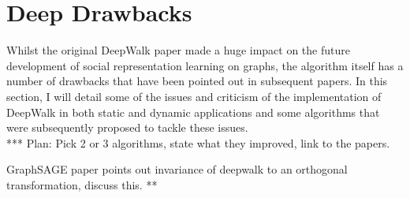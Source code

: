 \documentclass[a4paper]{article}
\begin{document}
\section{Deep Drawbacks}
Whilst the original DeepWalk paper made a huge impact on the future development
of social representation learning on graphs, the algorithm itself has a number
of drawbacks that have been pointed out in subsequent papers. In this section, I will detail some of the issues and criticism of the implementation of
DeepWalk in both static and dynamic applications and some algorithms that were subsequently proposed to tackle these issues.\\
***
Plan: Pick 2 or 3 algorithms, state what they improved, link to the papers.

GraphSAGE paper points out invariance of deepwalk to an orthogonal transformation, discuss this.
**
\end{document}
